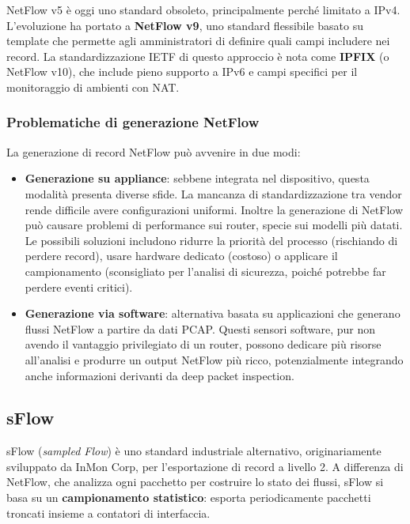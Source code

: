 NetFlow v5 è oggi uno standard obsoleto, principalmente perché limitato a IPv4.
L'evoluzione ha portato a \textbf{NetFlow v9}, uno standard flessibile basato
su template che permette agli amministratori di definire quali campi includere
nei record. La standardizzazione IETF di questo approccio è nota come
\textbf{IPFIX} (o NetFlow v10), che include pieno supporto a IPv6 e campi
specifici per il monitoraggio di ambienti con NAT.

\subsubsection{Problematiche di generazione NetFlow}

La generazione di record NetFlow può avvenire in due modi:

\begin{itemize}
\item \textbf{Generazione su appliance}: sebbene integrata nel dispositivo,
questa modalità presenta diverse sfide. La mancanza di standardizzazione
tra vendor rende difficile avere configurazioni uniformi. Inoltre la
generazione di NetFlow può causare problemi di performance sui router,
specie sui modelli più datati. Le possibili soluzioni includono ridurre
la priorità del processo (rischiando di perdere record), usare hardware
dedicato (costoso) o applicare il campionamento (sconsigliato per l'analisi
di sicurezza, poiché potrebbe far perdere eventi critici).
\item \textbf{Generazione via software}: alternativa basata su applicazioni
che generano flussi NetFlow a partire da dati PCAP. Questi sensori software,
pur non avendo il vantaggio privilegiato di un router, possono dedicare più
risorse all'analisi e produrre un output NetFlow più ricco, potenzialmente
integrando anche informazioni derivanti da deep packet inspection.
\end{itemize}

\subsection{sFlow}

sFlow (\textit{sampled Flow}) è uno standard industriale alternativo,
originariamente sviluppato da InMon Corp, per l'esportazione di record a
livello 2. A differenza di NetFlow, che analizza ogni pacchetto per costruire
lo stato dei flussi, sFlow si basa su un \textbf{campionamento statistico}:
esporta periodicamente pacchetti troncati insieme a contatori di interfaccia.

